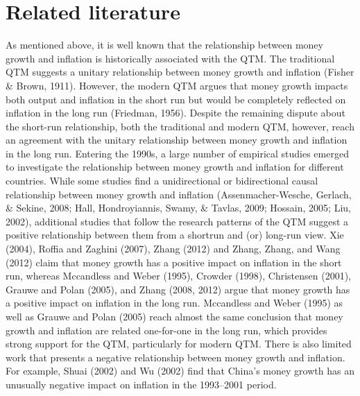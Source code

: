 \documentclass[a4paper,fleqn]{cas-sc}
\begin{document}
\section{Related literature}
As mentioned above, it is well known that the relationship between money growth and inflation is historically associated with the QTM. The traditional QTM suggests a unitary relationship between money growth and inflation (Fisher \& Brown, 1911). However, the modern QTM argues that money growth impacts both output and inflation in the short run but would be completely reflected on inflation in the long run (Friedman, 1956). Despite the remaining dispute about the short-run relationship, both the traditional and modern QTM, however, reach an agreement with the unitary relationship between money growth and inflation in the long run.
Entering the 1990s, a large number of empirical studies emerged to investigate the relationship between money growth and inflation for different countries. While some studies find a unidirectional or bidirectional causal relationship between money growth and inflation (Assenmacher-Wesche, Gerlach, \& Sekine, 2008; Hall, Hondroyiannis, Swamy, \& Tavlas, 2009; Hossain, 2005; Liu, 2002), additional studies that follow the research patterns of the QTM suggest a positive relationship between them from a shortrun and (or) long-run view. Xie (2004), Roffia and Zaghini (2007), Zhang (2012) and Zhang, Zhang, and Wang (2012) claim that money growth has a positive impact on inflation in the short run, whereas Mccandless and Weber (1995), Crowder (1998), Christensen (2001), Grauwe and Polan (2005), and Zhang (2008, 2012) argue that money growth has a positive impact on inflation in the long run. Mccandless and Weber (1995) as well as Grauwe and Polan (2005) reach almost the same conclusion that money growth and inflation are related one-for-one in the long run, which provides strong support for the QTM, particularly for modern QTM. There is also limited work that presents a negative relationship between money growth and inflation. For example, Shuai (2002) and Wu (2002) find that China's money growth has an unusually negative impact on inflation in the 1993–2001 period. 
\end{document}
